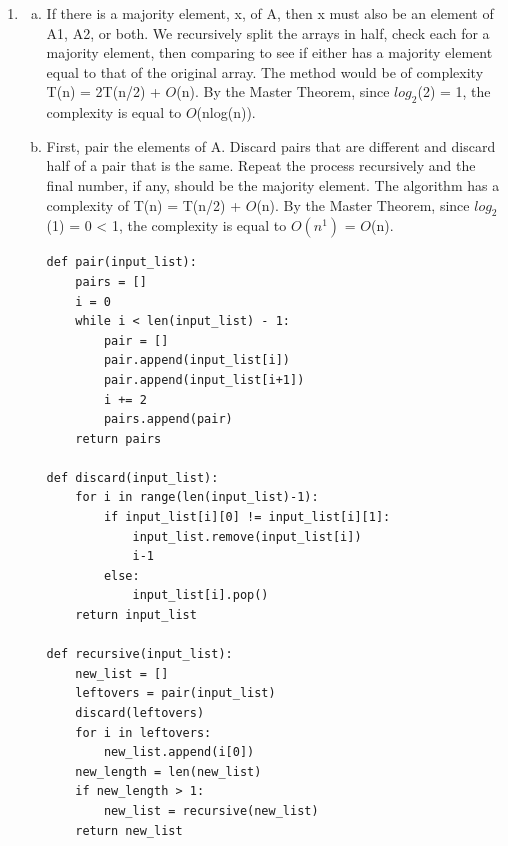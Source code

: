 \documentclass{article}
\begin{document}
\begin{enumerate}
    \item \begin{enumerate}[(a)]
        \item If there is a majority element, x, of A, then x must also be an element of A1, A2, or both. We recursively split the arrays in half, check each for a majority element, then comparing to see if
        either has a majority element equal to that of the original array. The method would be of complexity T(n) = 2T(n/2) + $O$(n). By the Master Theorem, since $log_{2}$(2) = 1, the complexity is equal
        to $O$(nlog(n)).
        \item First, pair the elements of A. Discard pairs that are different and discard half of a pair that is the same. Repeat the process recursively and the final number, if any, should be
        the majority element. The algorithm has a complexity of T(n) = T(n/2) + $O$(n). By the Master Theorem,  since $log_{2}$(1) = 0 < 1, the complexity is equal to $O(n^{1})$ = $O$(n).
        \begin{lstlisting}
def pair(input_list):
    pairs = []
    i = 0
    while i < len(input_list) - 1:
        pair = []
        pair.append(input_list[i])
        pair.append(input_list[i+1])
        i += 2
        pairs.append(pair)
    return pairs

def discard(input_list):
    for i in range(len(input_list)-1):
        if input_list[i][0] != input_list[i][1]:
            input_list.remove(input_list[i])
            i-1
        else:
            input_list[i].pop()
    return input_list

def recursive(input_list):
    new_list = []
    leftovers = pair(input_list)
    discard(leftovers)
    for i in leftovers:
        new_list.append(i[0])
    new_length = len(new_list)
    if new_length > 1:
        new_list = recursive(new_list)
    return new_list
        \end{lstlisting}
    \end{enumerate}


\end{enumerate}
\end{document}
